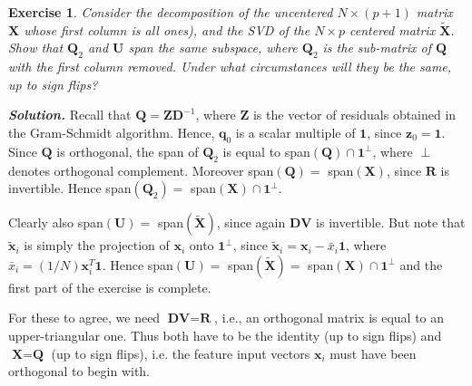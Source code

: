 \documentclass[12pt]{article}
\def\bQ{\textbf{Q}}
\def\bx{\textbf{x}}
\def\bz{\textbf{z}}
\def\bX{\textbf{X}}
\def\bV{\textbf{V}}
\def\bR{\textbf{R}}
\def\bQ{\textbf{Q}}
\def\bq{\textbf{q}}
\def\bOne{\textbf{1}}
\def\bU{\textbf{U}}
\def\bD{\textbf{D}}
\def\bV{\textbf{V}}
\def\bZ{\textbf{Z}}
\newtheorem{exercise}{Exercise}[section]
\newenvironment{solution}[1][\it{Solution}]{\textbf{#1. } }{\vspace{.5cm}}
\begin{document}
\begin{exercise}
Consider the decomposition of the uncentered $N \times (p+1)$ matrix $\bX$ whose first column is all ones), and the SVD of the $N \times p$ centered matrix $\tilde{\bX}$. Show that $\bQ_2$ and $\bU$ span the same subspace, where 
$\bQ_2$ is the sub-matrix of $\bQ$ with the first column removed. Under what circumstances will they be the same, up to sign flips?
\end{exercise}
\begin{solution}
Recall that $\bQ = \bZ \bD^{-1}$, where $\bZ$ is the vector of residuals obtained in the Gram-Schmidt algorithm. Hence, $\bq_0$ is a scalar multiple of $\bOne$, since $\bz_0 = \bOne$. Since $\bQ$ is orthogonal, the span of $\bQ_2$ is equal to span$(\bQ) \cap \bOne^\perp$, where $\perp$ denotes orthogonal complement. Moreover span$(\bQ) = $ span$(\bX)$, since $\bR$ is invertible. Hence span$(\bQ_2) = $ span$(\bX) \cap \bOne^\perp$.

Clearly also span$(\bU) = $ span$(\tilde{\bX})$, since again $\bD\bV$ is invertible. But note that $\tilde{\bx}_i$ is simply the projection of $\bx_i$ onto $\bOne^\perp$, since $\tilde{\bx}_i = \bx_i - \bar{x}_i \bOne$, where $\bar{x}_i  = (1/N) \bx_i^T \bOne$. Hence span$(\bU) = $ span$(\tilde{\bX}) = $ span$(\bX) \cap \bOne^\perp$ and the first part of the exercise is complete.

For these to agree, we need $\bD \bV = \bR$, i.e., an orthogonal matrix is equal to an upper-triangular one. Thus both have to be the identity (up to sign flips) and $\bX = \bQ$ (up to sign flips), i.e. the feature input vectors $\bx_i$ must have been orthogonal to begin with.


\end{solution}
\end{document}
